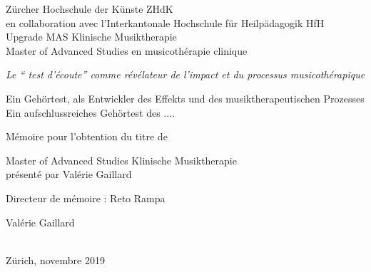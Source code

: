 
\begin{titlepage}
 \begin{center}
    \Large
     Zürcher Hochschule der Künste ZHdK\\
 	en collaboration avec l'Interkantonale Hochschule für
        Heilpädagogik HfH \\
	 Upgrade MAS Klinische Musiktherapie \\ Master of Advanced Studies en musicothérapie clinique\\
  \vfill
  { \LARGE
\emph{Le `` test d'écoute'' comme  révélateur de l'impact et du processus musicothérapique }\\ \bigskip


Ein Gehörtest, als Entwickler des Effekts und des
musiktherapeutischen Prozesses
Ein aufschlussreiches Gehörtest des ....} 
 \vfill
 
Mémoire pour l'obtention du titre de

Master of Advanced Studies Klinische Musiktherapie \\ présenté par Valérie Gaillard

{\large Directeur de mémoire : Reto Rampa}


 {\large

	 Valérie Gaillard \\  \hfill \\
	 \rule{0mm}{1pt} \hfill Zürich, novembre 2019}
 \end{center}
\end{titlepage}

